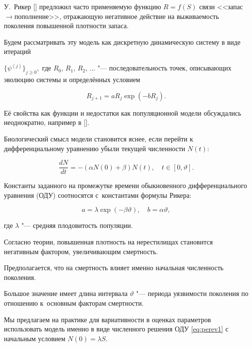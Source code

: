 У.~Рикер [] предложил часто применяемую функцию $R=f(S)$ связи <<за\-пас$\to$пополнение>>, отражающую негативное действие на выживаемость поколения повышенной плотности запаса. 

Будем рассматривать эту модель как дискретную динамическую систему в виде итераций 

$\{\psi ^{(j)}\}_{j\geq 0},$ где $R_0$, $R_1$, $R_2$, $\ldots $ "--- последовательность точек, описывающих эволюцию системы и определённых условием 

$$R_{j+1}= aR_j\exp(-bR_j).$$ 

Её свойства как функции и недостатки как популяционной модели обсуждались неоднократно, например в [].







Биологический смысл модели становится яснее, если перейти к дифференциальному уравнению убыли текущей численности $N(t)$:

\begin{equation}

\label{eq:perev1}

\frac{dN}{dt}= -(\alpha N(0)+\beta)N(t), \quad  t\in [0,\vartheta].

 \end{equation}

Константы заданного на промежутке времени обыкновенного дифференциального уравнения (ОДУ) соотносятся с~константами формулы Рикера: 

$$

a=\lambda\exp(-\beta\vartheta), \quad b=\alpha\vartheta,$$ 

где $\lambda$ "--- средняя плодовитость популяции. 

Согласно теории, повышенная плотность на нерестилищах становится негативным фактором, увеличивающим смертность. 

Предполагается, что на смертность влияет именно начальная численность поколения. 

Большое значение имеет длина интервала $\vartheta$ "--- периода уязвимости поколения по отношению к~основным факторам смертности. 

Мы предлагаем на практике для вариативности в оценках параметров использовать модель именно в виде численного решения ОДУ \eqref{eq:perev1} с начальным условием $N(0)=\lambda S.$







